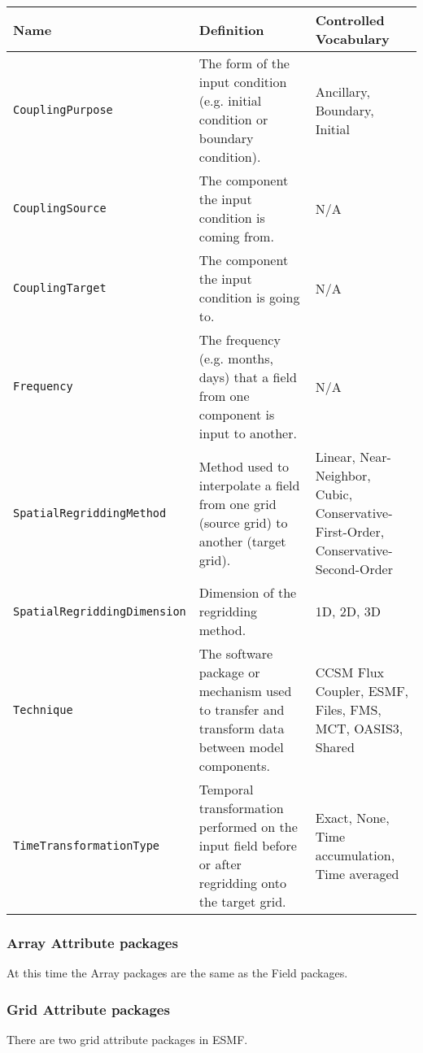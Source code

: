 \begin{tabular}{|p{8cm}|p{20cm}|p{10cm}|}
    {\bf Name} & {\bf Definition} & {\bf Controlled Vocabulary} \\
    \hline\hline
    {\tt CouplingPurpose} & The form of the input condition (e.g. initial condition or boundary condition). &  Ancillary, Boundary, Initial\\
    {\tt CouplingSource} & The component the input condition is coming from. & N/A \\ 
    {\tt CouplingTarget} & The component the input condition is going to. & N/A \\ 
    {\tt Frequency} & The frequency (e.g. months, days) that a field from one component is input to another. & N/A\\ 
    {\tt SpatialRegriddingMethod} & Method used to interpolate a field from one grid (source grid) to another (target grid). & Linear, Near-Neighbor, Cubic, Conservative-First-Order, Conservative-Second-Order\\ 
    {\tt SpatialRegriddingDimension} & Dimension of the regridding method. & 1D, 2D, 3D\\ 
    {\tt Technique} & The software package or mechanism used to transfer and transform data between model components. & CCSM Flux Coupler, ESMF, Files, FMS, MCT, OASIS3, Shared\\ 
    {\tt TimeTransformationType} & Temporal transformation performed on the input field before or after regridding onto the target grid.& Exact, None, Time accumulation, Time averaged\\ 
\end{tabular}




\vspace{.20in}
\subsubsection{Array Attribute packages}
\label{ArrayAttributePackages}

At this time the Array packages are the same as the Field packages.


\vspace{.20in}
\subsubsection{Grid Attribute packages}
\label{GridAttributePackages}

There are two grid attribute packages in ESMF. 

